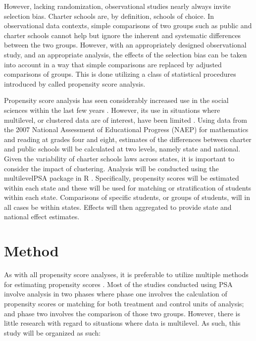 \documentclass[man,floatsintext]{apa6}
\begin{document}
However, lacking randomization, observational studies nearly always invite selection bias. Charter schools are, by definition, schools of choice. In observational data contexts, simple comparisons of two groups such as public and charter schools cannot help but ignore the inherent and systematic differences between the two groups. However, with an appropriately designed observational study, and an appropriate analysis, the effects of the selection bias can be taken into account in a way that simple comparisons are replaced by adjusted comparisons of groups. This is done utilizing a class of statistical procedures introduced by \textcite{RosenbaumRubin1983} called propensity score analysis.

Propensity score analysis has seen considerably increased use in the social sciences within the last few years \textcite{ThoemmesKim2011}. However, its use in situations where multilevel, or clustered data are of interest, have been limited \parencite{ArpinoMealli2008}. Using data from the 2007 National Assessment of Educational Progress (NAEP) for mathematics and reading at grades four and eight, estimates of the differences between charter and public schools will be calculated at two levels, namely state and national. Given the variability of charter schools laws across states, it is important to consider the impact of clustering. Analysis will be conducted using the multilevelPSA package in R \parencite{rdevelopment}. Specifically, propensity scores will be estimated within each state and these will be used for matching or stratification of students within each state. Comparisons of specific students, or groups of students, will in all cases be within states. Effects will then aggregated to provide state and national effect estimates.

\section{Method}
	
As with all propensity score analyses, it is preferable to utilize multiple methods for estimating propensity scores \parencite[see e.g.][]{Stuart2010}. Most of the studies conducted using PSA involve analysis in two phases where phase one involves the calculation of propensity scores or matching for both treatment and control units of analysis; and phase two involves the comparison of those two groups. However, there is little research with regard to situations where data is multilevel. As such, this study will be organized as such:
\end{document}
